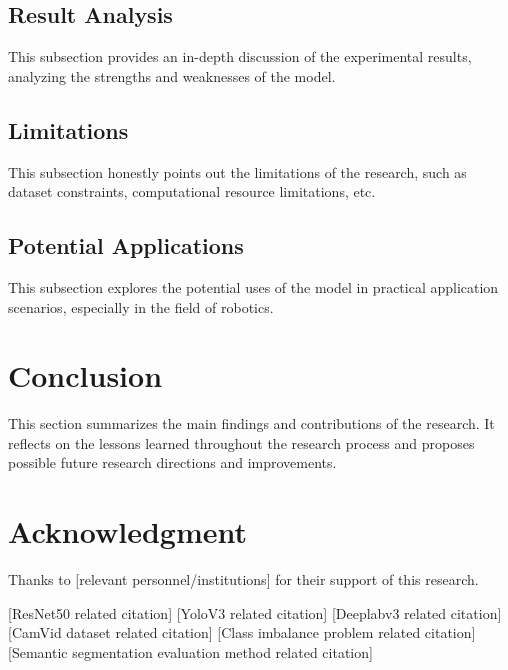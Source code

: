 \documentclass[conference]{IEEEtran}
\begin{document}
\subsection{Result Analysis}
This subsection provides an in-depth discussion of the experimental results, analyzing the strengths and weaknesses of the model.

\subsection{Limitations}
This subsection honestly points out the limitations of the research, such as dataset constraints, computational resource limitations, etc.

\subsection{Potential Applications}
This subsection explores the potential uses of the model in practical application scenarios, especially in the field of robotics.

\section{Conclusion}
This section summarizes the main findings and contributions of the research. It reflects on the lessons learned throughout the research process and proposes possible future research directions and improvements.

\section*{Acknowledgment}
Thanks to [relevant personnel/institutions] for their support of this research.

\begin{thebibliography}{00}
 [ResNet50 related citation]
 [YoloV3 related citation]
 [Deeplabv3 related citation]
 [CamVid dataset related citation]
 [Class imbalance problem related citation]
 [Semantic segmentation evaluation method related citation]
\end{thebibliography}
\end{document}
